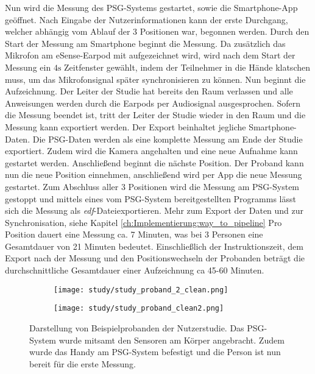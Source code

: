 Nun wird die Messung des PSG-Systems gestartet, sowie die Smartphone-App geöffnet. 
Nach Eingabe der Nutzerinformationen kann der erste Durchgang, welcher abhängig vom Ablauf der 3 Positionen war, begonnen werden.
Durch den Start der Messung am Smartphone beginnt die Messung. 
Da zusätzlich das Mikrofon am eSense-Earpod mit aufgezeichnet wird, wird nach dem Start der Messung ein $4\si{\s}$ Zeitfenster gewählt, indem der Teilnehmer in die Hände klatschen muss, um das Mikrofonsignal später synchronisieren zu können.
Nun beginnt die Aufzeichnung. Der Leiter der Studie hat bereits den Raum verlassen und alle Anweisungen werden durch die Earpods per Audiosignal ausgesprochen. 
Sofern die Messung beendet ist, tritt der Leiter der Studie wieder in den Raum und die Messung kann exportiert werden. 
Der Export beinhaltet jegliche Smartphone-Daten. Die PSG-Daten werden als eine komplette Messung am Ende der Studie exportiert.
Zudem wird die Kamera angehalten und eine neue Aufnahme kann gestartet werden.
Anschließend beginnt die nächste Position. Der Proband kann nun die neue Position einnehmen, anschließend wird per App die neue Messung gestartet.
Zum Abschluss aller 3 Positionen wird die Messung am PSG-System gestoppt und mittels eines vom PSG-System bereitgestellten Programms lässt sich die Messung als \glqq \textit{edf}-Datei\grqq exportieren.
Mehr zum Export der Daten und zur Synchronisation, siehe Kapitel \ref{ch:Implementierung:way_to_pipeline}
Pro Position dauert eine Messung ca. 7 Minuten, was bei 3 Personen eine Gesamtdauer von 21 Minuten bedeutet.
Einschließlich der Instruktionszeit, dem Export nach der Messung und den Positionswechseln der Probanden beträgt die durchschnittliche Gesamtdauer einer Aufzeichnung ca 45-60 Minuten. 

\begin{figure}[ht]
    \centering
    \begin{subfigure}{0.53\textwidth}
        \texttt{[image: study/study\_proband\_2\_clean.png]}
    \end{subfigure}
    \begin{subfigure}{0.3\textwidth}
        \texttt{[image: study/study\_proband\_clean2.png]}
    \end{subfigure}
    \caption{Darstellung von Beispielprobanden der Nutzerstudie. Das PSG-System wurde mitsamt den Sensoren am Körper angebracht. Zudem wurde das Handy am PSG-System befestigt und die Person ist nun bereit für die erste Messung.}
    \label{implementation:study:measurement_example}
\end{figure}

